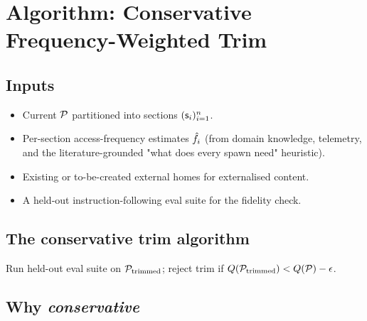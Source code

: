 \section{Algorithm: Conservative Frequency-Weighted Trim}
\label{sec:algo}

\subsection{Inputs}

\begin{itemize}
  \item Current $\mathcal{P}$ partitioned into sections $(\mathsf{s}_i)_{i=1}^{n}$.
  \item Per-section access-frequency estimates $\hat{f}_i$ (from
    domain knowledge, telemetry, and the literature-grounded "what does
    every spawn need" heuristic).
  \item Existing or to-be-created external homes for externalised content.
  \item A held-out instruction-following eval suite for the fidelity check.
\end{itemize}

\subsection{The conservative trim algorithm}

\begin{algorithm}[H]
\SetAlgoLined
{}
Run held-out eval suite on $\mathcal{P}_{\mathrm{trimmed}}$;
  reject trim if $Q(\mathcal{P}_{\mathrm{trimmed}}) < Q(\mathcal{P}) - \epsilon$.\;
\;
\caption{Conservative frequency-weighted trim}
\label{alg:trim}
\end{algorithm}

\subsection{Why \emph{conservative}}

